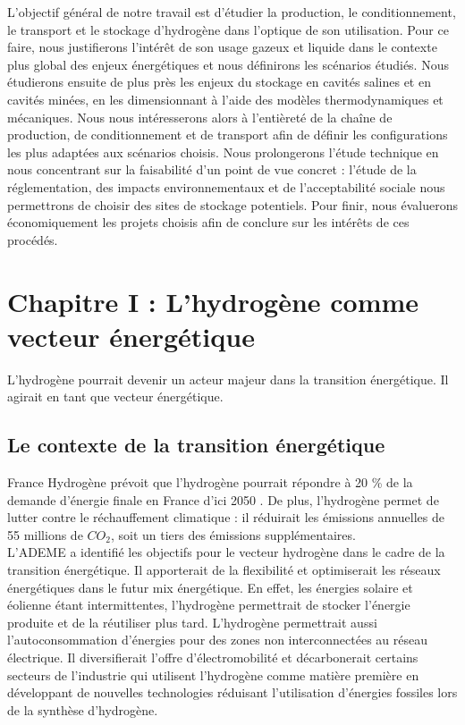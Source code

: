 \documentclass[11pt,french,a4paper]{article}
\begin{document}
L’objectif général de notre travail est d’étudier la production, le conditionnement, le transport et le stockage d’hydrogène dans l’optique de son utilisation. Pour ce faire, nous justifierons l’intérêt de son usage gazeux et liquide dans le contexte plus global des enjeux énergétiques et nous définirons les scénarios étudiés. Nous étudierons ensuite de plus près les enjeux du stockage en cavités salines et en cavités minées, en les dimensionnant à l’aide des modèles thermodynamiques et mécaniques. Nous nous intéresserons alors à l’entièreté de la chaîne de production, de conditionnement et de transport afin de définir les configurations les plus adaptées aux scénarios choisis. Nous prolongerons l’étude technique en nous concentrant sur la faisabilité d’un point de vue concret : l’étude de la réglementation, des impacts environnementaux et de l’acceptabilité sociale nous permettrons de choisir des sites de stockage potentiels. Pour finir, nous évaluerons économiquement les projets choisis afin de conclure sur les intérêts de ces procédés. 









\section{Chapitre I : L'hydrogène comme vecteur énergétique}
L'hydrogène pourrait devenir un acteur majeur dans la transition énergétique. Il agirait en tant que vecteur énergétique.

\subsection{Le  contexte de la transition énergétique}
France Hydrogène prévoit que l'hydrogène pourrait répondre à 20 \% de la demande d’énergie finale en France d’ici 2050  \cite{InternationalEnergyAgency_2021}. De plus, l’hydrogène permet de lutter contre le réchauffement climatique : il réduirait les émissions annuelles de 55 millions de $CO_2$,  soit un tiers des émissions supplémentaires. \\

L’ADEME a identifié les objectifs pour le vecteur hydrogène dans le cadre de la transition énergétique. Il apporterait de la flexibilité et optimiserait les réseaux énergétiques dans le futur mix énergétique. En effet, les énergies solaire et éolienne étant intermittentes, l’hydrogène permettrait de stocker l’énergie produite et de la réutiliser plus tard. L’hydrogène permettrait aussi l’autoconsommation d’énergies pour des zones non interconnectées au réseau électrique. Il diversifierait l’offre d’électromobilité et décarbonerait certains secteurs de l’industrie qui utilisent l’hydrogène comme matière première en développant de nouvelles technologies réduisant l’utilisation d’énergies fossiles lors de la synthèse d’hydrogène.
\end{document}
